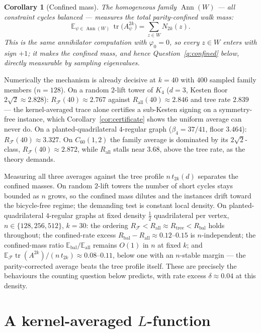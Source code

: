 \documentclass[11pt]{article}
\newtheorem{corollary}[lemma]{Corollary}
\theoremstyle{remark}
\DeclareMathOperator{\tr}{tr}
\begin{document}
\begin{corollary}[Confined mass]\label{cor:balanced}
The homogeneous family $\operatorname{Ann}(W)$ --- all constraint cycles
\emph{balanced} --- measures the total parity-confined walk mass:
\[
\mathbb E_{\psi\in\operatorname{Ann}(W)}\,\tr\!\big(A_\psi^{2k}\big)
=\sum_{z\in W}N_{2k}(z).
\]
This is the same annihilator computation with $\varphi_0=0$, so every
$z\in W$ enters with sign $+1$; it makes the confined mass, and hence
Question~\ref{q:confined} below, directly measurable by sampling
eigenvalues.
\end{corollary}

Numerically the mechanism is already decisive at $k=40$ with $400$
sampled family members ($n=128$). On a random $2$-lift tower of $K_4$
($d=3$, Kesten floor $2\sqrt2\approx2.828$):
$R_{\mathcal F}(40)\approx2.767$ against
$R_{\mathrm{all}}(40)\approx2.846$ and tree rate $2.839$ --- the
kernel-averaged trace alone certifies a sub-Kesten signing on a
symmetry-free instance, which Corollary~\ref{cor:certificate} shows the
uniform average can never do. On a planted-quadrilateral $4$-regular
graph ($\beta_4=37/41$, floor $3.464$):
$R_{\mathcal F}(40)\approx3.327$. On $C_{60}(1,2)$ the family average is
dominated by its $2\sqrt2$-class, $R_{\mathcal F}(40)\approx2.872$,
while $R_{\mathrm{all}}$ stalls near $3.68$, above the tree rate, as the
theory demands.

Measuring all three averages against the tree profile $n\,t_{2k}(d)$
separates the confined masses. On random $2$-lift towers the number of
short cycles stays bounded as $n$ grows, so the confined mass dilutes
and the instances drift toward the bicycle-free regime; the demanding
test is constant local density. On planted-quadrilateral $4$-regular
graphs at fixed density $\tfrac12$ quadrilateral per vertex,
$n\in\{128,256,512\}$, $k=30$: the ordering
$R_{\mathcal F}<R_{\mathrm{all}}\approx R_{\mathrm{tree}}<
R_{\mathrm{bal}}$ holds throughout; the confined-rate excess
$R_{\mathrm{bal}}-R_{\mathrm{all}}\approx0.12$--$0.15$ is
$n$-independent; the confined-mass ratio
$\mathbb E_{\mathrm{bal}}/\mathbb E_{\mathrm{all}}$ remains $O(1)$ in
$n$ at fixed $k$; and
$\mathbb E_{\mathcal F}\tr(A^{2k})/(n\,t_{2k})\approx0.08$--$0.11$,
below one with an $n$-stable margin --- the parity-corrected average
beats the tree profile itself. These are precisely the behaviours the
counting question below predicts, with rate excess $\delta\approx0.04$
at this density.

\section{A kernel-averaged $L$-function}\label{sec:zeta}
\end{document}
